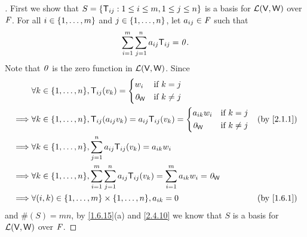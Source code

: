 \begin{proof}[]
  First we show that \(S = \left\lbrace\mathsf{T}_{i j} : 1 \leq i \leq m, 1 \leq j \leq n\right\rbrace\) is a basis for \(\mathcal{L}(\mathsf{V}, \mathsf{W})\) over \(\mathit{F}\).
  For all \(i \in \left\lbrace1, \dots, m\right\rbrace\) and \(j \in \left\lbrace1, \dots, n\right\rbrace\), let \(a_{i j} \in \mathit{F}\) such that
  \[
    \sum_{i = 1}^m \sum_{j = 1}^n a_{i j} \mathsf{T}_{i j} = \mathit{0}.
  \]
  Note that \(\mathit{0}\) is the zero function in \(\mathcal{L}(\mathsf{V}, \mathsf{W})\).
  Since
  \begin{align*}
             & \forall k \in \set{1, \dots, n}, \T_{i j}(v_k) = \begin{dcases}
                                                                  w_i      & \text{if } k = j    \\
                                                                  \zv_{\W} & \text{if } k \neq j
                                                                \end{dcases}                                                                            \\
    \implies & \forall k \in \set{1, \dots, n}, \T_{i j}(a_{i j} v_k) = a_{i j} \T_{i j}(v_k) = \begin{dcases}
                                                                                                  a_{i k} w_i & \text{if } k = j    \\
                                                                                                  \zv_{\W}    & \text{if } k \neq j
                                                                                                \end{dcases}                              &  & \text{(by \cref{2.1.1})}   \\
    \implies & \forall k \in \set{1, \dots, n}, \sum_{j = 1}^n a_{i j} \T_{i j}(v_k) = a_{i k} w_i                                                                        \\
    \implies & \forall k \in \set{1, \dots, n}, \sum_{i = 1}^m \sum_{j = 1}^n a_{i j} \T_{i j}(v_k) = \sum_{i = 1}^m a_{i k} w_i = \zv_{\W}                               \\
    \implies & \forall (i, k) \in \set{1, \dots, m} \times \set{1, \dots, n}, a_{i k} = 0                                                   &  & \text{(by \cref{1.6.1})}
  \end{align*}
  and \(\#(S) = mn\), by \cref{1.6.15}(a) and \cref{2.4.10} we know that \(S\) is a basis for \(\mathcal{L}(\mathsf{V}, \mathsf{W})\) over \(\mathit{F}\).


\end{proof}
